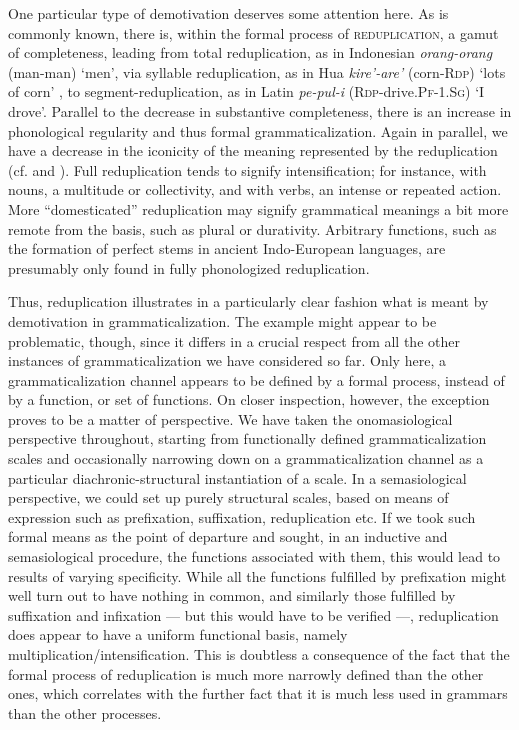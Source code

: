 One particular type of demotivation deserves some attention here. As is commonly known, there is, within the formal process of \textsc{reduplication}, a gamut of completeness, leading from total reduplication, as in Indonesian \textit{orang-orang} (man-man) ‘men’, via syllable reduplication, as in Hua \textit{kire'-are'} (corn-\textsc{Rdp}) ‘lots of corn’ \citep[222]{Haiman1980}, to segment-reduplication, as in Latin \textit{pe-pul-i} (\textsc{Rdp}{}-drive.\textsc{Pf-1.Sg}) ‘I drove’. Parallel to the decrease in substantive completeness, there is an increase in phonological regularity and thus formal grammaticalization. Again in parallel, we have a decrease in the iconicity of the meaning represented by the reduplication (cf. \citealt{André1978} and \citealt[46--48]{HeineEtAl1984}). Full reduplication tends to signify intensification; for instance, with nouns, a multitude or collectivity, and with verbs, an intense or repeated action. More “domesticated” reduplication may signify grammatical meanings a bit more remote from the basis, such as plural or durativity. Arbitrary functions, such as the formation of perfect stems in ancient Indo-European languages, are presumably only found in fully phonologized reduplication.

Thus, reduplication illustrates in a particularly clear fashion what is meant by demotivation in grammaticalization. The example might appear to be problematic, though, since it differs in a crucial respect from all the other instances of grammaticalization we have considered so far. Only here, a grammaticalization channel appears to be defined by a formal process, instead of by a function, or set of functions. On closer inspection, however, the exception proves to be a matter of perspective. We have taken the onomasiological perspective throughout, starting from functionally defined grammaticalization scales and occasionally narrowing down on a grammaticalization channel as a particular diachronic-structural instantiation of a scale. In a semasiological perspective, we could set up purely structural scales, based on means of expression such as prefixation, suffixation, reduplication etc. If we took such formal means as the point of departure and sought, in an inductive and semasiological procedure, the functions associated with them, this would lead to results of varying specificity. While all the functions fulfilled by prefixation might well turn out to have nothing in common, and similarly those fulfilled by suffixation and infixation — but this would have to be verified —, reduplication does appear to have a uniform functional basis, namely multiplication/intensification. This is doubtless a consequence of the fact that the formal process of reduplication is much more narrowly defined than the other ones, which correlates with the further fact that it is much less used in grammars than the other processes.

